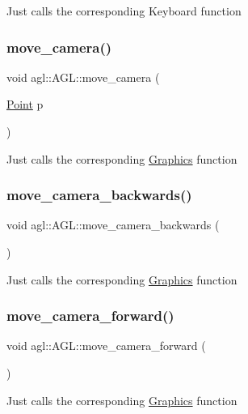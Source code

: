 Just calls the corresponding Keyboard function \mbox{\label{classagl_1_1AGL_ac81c6ecc1363396270485955320b376b}} 
\subsubsection{\texorpdfstring{move\_camera()}{move\_camera()}}
{\footnotesize\ttfamily void agl\+::\+A\+G\+L\+::move\+\_\+camera (\begin{DoxyParamCaption}\item[{\mbox{\hyperlink{classagl_1_1Point}{Point}}}]{p }\end{DoxyParamCaption})}

Just calls the corresponding \mbox{\hyperlink{classagl_1_1Graphics}{Graphics}} function \mbox{\label{classagl_1_1AGL_aeef87301449abfa2ee58c6851788176c}} 
\subsubsection{\texorpdfstring{move\_camera\_backwards()}{move\_camera\_backwards()}}
{\footnotesize\ttfamily void agl\+::\+A\+G\+L\+::move\+\_\+camera\+\_\+backwards (\begin{DoxyParamCaption}{ }\end{DoxyParamCaption})}

Just calls the corresponding \mbox{\hyperlink{classagl_1_1Graphics}{Graphics}} function \mbox{\label{classagl_1_1AGL_a0ef401fb5befea5f84a8342550354279}} 
\subsubsection{\texorpdfstring{move\_camera\_forward()}{move\_camera\_forward()}}
{\footnotesize\ttfamily void agl\+::\+A\+G\+L\+::move\+\_\+camera\+\_\+forward (\begin{DoxyParamCaption}{ }\end{DoxyParamCaption})}

Just calls the corresponding \mbox{\hyperlink{classagl_1_1Graphics}{Graphics}} function \mbox{\label{classagl_1_1AGL_a531a702149d0781c35fe87a01ea2bf67}} 
